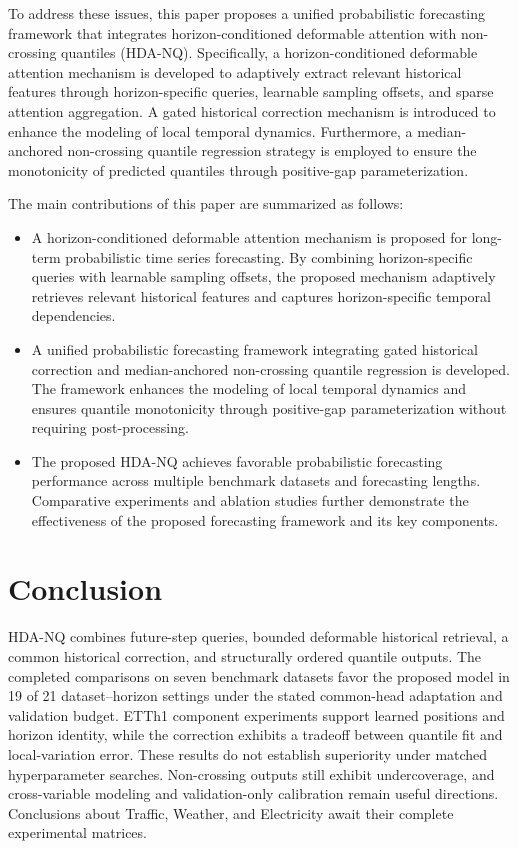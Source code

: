 \documentclass[sigconf,anonymous,review]{acmart}
\begin{document}
To address these issues, this paper proposes a unified probabilistic forecasting framework that integrates horizon-conditioned deformable attention with non-crossing quantiles (HDA-NQ). Specifically, a horizon-conditioned deformable attention mechanism is developed to adaptively extract relevant historical features through horizon-specific queries, learnable sampling offsets, and sparse attention aggregation. A gated historical correction mechanism is introduced to enhance the modeling of local temporal dynamics. Furthermore, a median-anchored non-crossing quantile regression strategy is employed to ensure the monotonicity of predicted quantiles through positive-gap parameterization.

The main contributions of this paper are summarized as follows:

\begin{itemize}

\item A horizon-conditioned deformable attention mechanism is proposed for long-term probabilistic time series forecasting. By combining horizon-specific queries with learnable sampling offsets, the proposed mechanism adaptively retrieves relevant historical features and captures horizon-specific temporal dependencies.

\item A unified probabilistic forecasting framework integrating gated historical correction and median-anchored non-crossing quantile regression is developed. The framework enhances the modeling of local temporal dynamics and ensures quantile monotonicity through positive-gap parameterization without requiring post-processing.

\item The proposed HDA-NQ achieves favorable probabilistic forecasting performance across multiple benchmark datasets and forecasting lengths. Comparative experiments and ablation studies further demonstrate the effectiveness of the proposed forecasting framework and its key components.

\end{itemize}





\section{Conclusion}
HDA-NQ combines future-step queries, bounded deformable historical retrieval, a common historical correction, and structurally ordered quantile outputs. The completed comparisons on seven benchmark datasets favor the proposed model in 19 of 21 dataset--horizon settings under the stated common-head adaptation and validation budget. ETTh1 component experiments support learned positions and horizon identity, while the correction exhibits a tradeoff between quantile fit and local-variation error. These results do not establish superiority under matched hyperparameter searches. Non-crossing outputs still exhibit undercoverage, and cross-variable modeling and validation-only calibration remain useful directions. Conclusions about Traffic, Weather, and Electricity await their complete experimental matrices.


\begingroup
\balance
{}

\endgroup
\end{document}
